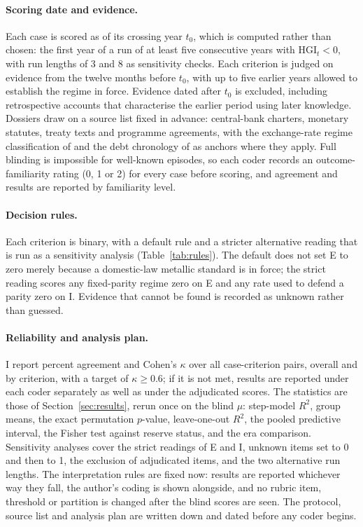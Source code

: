\documentclass[11pt,letterpaper]{article}
\theoremstyle{definition}
\theoremstyle{plain}
\newcommand{\HGI}{\mathrm{HGI}}
\begin{document}
\paragraph{Scoring date and evidence.} Each case is scored as of its crossing year $t_0$, which is computed rather than chosen: the first year of a run of at least five consecutive years with $\HGI_t<0$, with run lengths of 3 and 8 as sensitivity checks. Each criterion is judged on evidence from the twelve months before $t_0$, with up to five earlier years allowed to establish the regime in force. Evidence dated after $t_0$ is excluded, including retrospective accounts that characterise the earlier period using later knowledge. Dossiers draw on a source list fixed in advance: central-bank charters, monetary statutes, treaty texts and programme agreements, with the exchange-rate regime classification of \citet{ilzetzki2019} and the debt chronology of \citet{reinhart2009} as anchors where they apply. Full blinding is impossible for well-known episodes, so each coder records an outcome-familiarity rating (0, 1 or 2) for every case before scoring, and agreement and results are reported by familiarity level.

\paragraph{Decision rules.} Each criterion is binary, with a default rule and a stricter alternative reading that is run as a sensitivity analysis (Table~\ref{tab:rules}). The default does not set E to zero merely because a domestic-law metallic standard is in force; the strict reading scores any fixed-parity regime zero on E and any rate used to defend a parity zero on I. Evidence that cannot be found is recorded as unknown rather than guessed.

\paragraph{Reliability and analysis plan.} I report percent agreement and Cohen's $\kappa$ \citep{cohen1960} over all case-criterion pairs, overall and by criterion, with a target of $\kappa\ge0.6$; if it is not met, results are reported under each coder separately as well as under the adjudicated scores. The statistics are those of Section~\ref{sec:results}, rerun once on the blind $\mu$: step-model $R^2$, group means, the exact permutation $p$-value, leave-one-out $R^2$, the pooled predictive interval, the Fisher test against reserve status, and the era comparison. Sensitivity analyses cover the strict readings of E and I, unknown items set to 0 and then to 1, the exclusion of adjudicated items, and the two alternative run lengths. The interpretation rules are fixed now: results are reported whichever way they fall, the author's coding is shown alongside, and no rubric item, threshold or partition is changed after the blind scores are seen. The protocol, source list and analysis plan are written down and dated before any coder begins.
\end{document}

